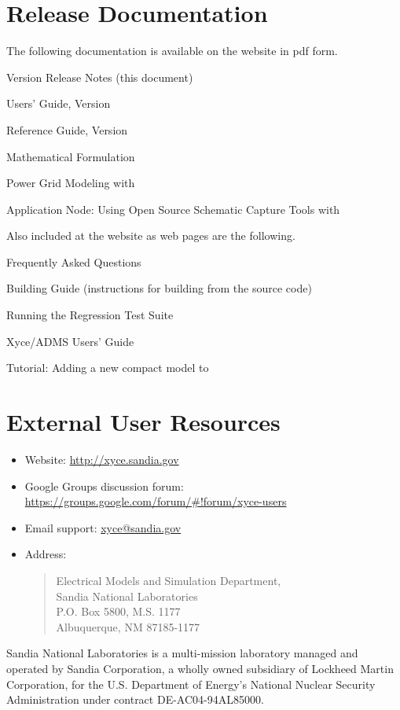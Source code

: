 \documentclass{article}
\begin{document}
\section{\Xyce{} Release \XyceVersionVar{} Documentation}
The following \Xyce{} documentation is available on the \Xyce{} website in pdf
form.
\begin{XyceItemize}
  \item \Xyce{} Version \XyceVersionVar{} Release Notes (this document)
  \item \Xyce{} Users' Guide, Version \XyceVersionVar{}
  \item \Xyce{} Reference Guide, Version \XyceVersionVar{}
  \item \Xyce{} Mathematical Formulation
  \item Power Grid Modeling with \Xyce{}
  \item Application Node: Using Open Source Schematic Capture Tools with \Xyce{}
\end{XyceItemize}
Also included at the \Xyce{} website as web pages are the following.
\begin{XyceItemize}
  \item Frequently Asked Questions
  \item Building Guide (instructions for building \Xyce{} from the source code)
  \item Running the \Xyce{} Regression Test Suite
  \item Xyce/ADMS Users' Guide
  \item Tutorial:  Adding a new compact model to \Xyce{}
\end{XyceItemize}


\section{External User Resources}
\begin{itemize}
  \item Website: {\color{XyceDeepRed}\url{http://xyce.sandia.gov}}
  \item Google Groups discussion forum:
    {\color{XyceDeepRed}\url{https://groups.google.com/forum/#!forum/xyce-users}}
  \item Email support:
    {\color{XyceDeepRed}\href{mailto:xyce@sandia.gov}{xyce@sandia.gov}}
  \item Address:
    \begin{quote}
            Electrical Models and Simulation Department,\\
            Sandia National Laboratories\\
            P.O. Box 5800, M.S. 1177\\
            Albuquerque, NM 87185-1177 \\
    \end{quote}
\end{itemize}

\vspace*{\fill}
Sandia National Laboratories is a multi-mission laboratory managed and
operated by Sandia Corporation, a wholly owned subsidiary of Lockheed Martin
Corporation, for the U.S. Department of Energy's National Nuclear Security
Administration under contract DE-AC04-94AL85000.
\end{document}
